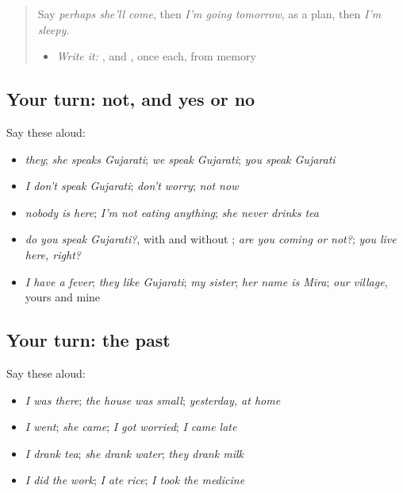\label{lesson:GU-R150-not-ask-past}



\begin{quote}
Say \emph{perhaps she'll come}, then \emph{I'm going tomorrow}, as a plan, then \emph{I'm sleepy}.

\begin{itemize}
\raggedright
  \item \emph{Write it:} \textbf{}, \textbf{} and \textbf{}, once each, from memory
\end{itemize}
\end{quote}

\subsection*{Your turn: not, and yes or no}
Say these aloud:

\begin{itemize}
\raggedright
  \item \emph{they}; \emph{she speaks Gujarati}; \emph{we speak Gujarati}; \emph{you speak Gujarati}
  \item \emph{I don't speak Gujarati}; \emph{don't worry}; \emph{not now}
  \item \emph{nobody is here}; \emph{I'm not eating anything}; \emph{she never drinks tea}
  \item \emph{do you speak Gujarati?}, with and without \textbf{}; \emph{are you coming or not?}; \emph{you live here, right?}
  \item \emph{I have a fever}; \emph{they like Gujarati}; \emph{my sister}; \emph{her name is Mira}; \emph{our village}, yours and mine
\end{itemize}

\subsection*{Your turn: the past}
Say these aloud:

\begin{itemize}
\raggedright
  \item \emph{I was there}; \emph{the house was small}; \emph{yesterday, at home}
  \item \emph{I went}; \emph{she came}; \emph{I got worried}; \emph{I came late}
  \item \emph{I drank tea}; \emph{she drank water}; \emph{they drank milk}
  \item \emph{I did the work}; \emph{I ate rice}; \emph{I took the medicine}
\end{itemize}

